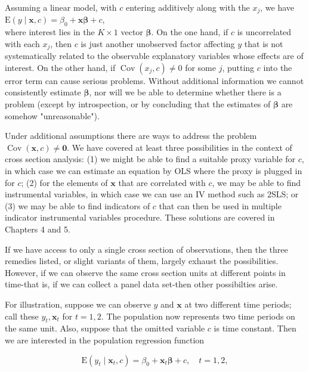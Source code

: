 \documentclass[10pt]{article}
\begin{document}
Assuming a linear model, with $c$ entering additively along with the $x_{j}$, we have\\
$\mathrm{E}(y \mid \mathbf{x}, c)=\beta_{0}+\mathbf{x} \boldsymbol{\beta}+c$,\\
where interest lies in the $K \times 1$ vector $\boldsymbol{\beta}$. On the one hand, if $c$ is uncorrelated with each $x_{j}$, then $c$ is just another unobserved factor affecting $y$ that is not systematically related to the observable explanatory variables whose effects are of interest. On the other hand, if $\operatorname{Cov}\left(x_{j}, c\right) \neq 0$ for some $j$, putting $c$ into the error term can cause serious problems. Without additional information we cannot consistently estimate $\boldsymbol{\beta}$, nor will we be able to determine whether there is a problem (except by introspection, or by concluding that the estimates of $\boldsymbol{\beta}$ are somehow "unreasonable").

Under additional assumptions there are ways to address the problem $\operatorname{Cov}(\mathbf{x}, c) \neq \mathbf{0}$. We have covered at least three possibilities in the context of cross section analysis: (1) we might be able to find a suitable proxy variable for $c$, in which case we can estimate an equation by OLS where the proxy is plugged in for $c$; (2) for the elements of $\mathbf{x}$ that are correlated with $c$, we may be able to find instrumental variables, in which case we can use an IV method such as 2SLS; or (3) we may be able to find indicators of $c$ that can then be used in multiple indicator instrumental variables procedure. These solutions are covered in Chapters 4 and 5.

If we have access to only a single cross section of observations, then the three remedies listed, or slight variants of them, largely exhaust the possibilities. However, if we can observe the same cross section units at different points in time-that is, if we can collect a panel data set-then other possibilties arise.

For illustration, suppose we can observe $y$ and $\mathbf{x}$ at two different time periods; call these $y_{t}, \mathbf{x}_{t}$ for $t=1,2$. The population now represents two time periods on the same unit. Also, suppose that the omitted variable $c$ is time constant. Then we are interested in the population regression function


\begin{equation*}
\mathrm{E}\left(y_{t} \mid \mathbf{x}_{t}, c\right)=\beta_{0}+\mathbf{x}_{t} \boldsymbol{\beta}+c, \quad t=1,2, \tag{10.3}
\end{equation*}
\end{document}
